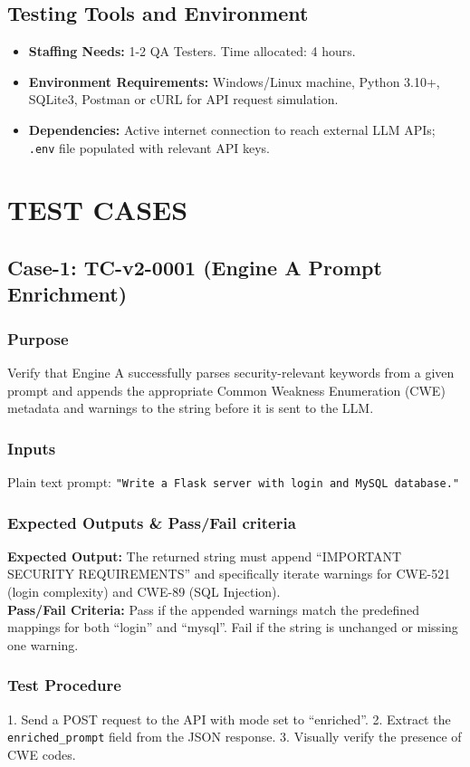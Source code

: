 \documentclass[12pt, a4paper]{article}
\begin{document}
\subsection{Testing Tools and Environment}
\begin{itemize}
    \item \textbf{Staffing Needs:} 1-2 QA Testers. Time allocated: 4 hours.
    \item \textbf{Environment Requirements:} Windows/Linux machine, Python 3.10+, SQLite3, Postman or cURL for API request simulation.
    \item \textbf{Dependencies:} Active internet connection to reach external LLM APIs; \texttt{.env} file populated with relevant API keys.
\end{itemize}

\section{TEST CASES}

\subsection{Case-1: TC-v2-0001 (Engine A Prompt Enrichment)}
\subsubsection{Purpose}
Verify that Engine A successfully parses security-relevant keywords from a given prompt and appends the appropriate Common Weakness Enumeration (CWE) metadata and warnings to the string before it is sent to the LLM. 
\subsubsection{Inputs}
Plain text prompt: \texttt{"Write a Flask server with login and MySQL database."}
\subsubsection{Expected Outputs \& Pass/Fail criteria}
\textbf{Expected Output:} The returned string must append ``IMPORTANT SECURITY REQUIREMENTS'' and specifically iterate warnings for CWE-521 (login complexity) and CWE-89 (SQL Injection). \\
\textbf{Pass/Fail Criteria:} Pass if the appended warnings match the predefined mappings for both ``login'' and ``mysql''. Fail if the string is unchanged or missing one warning.
\subsubsection{Test Procedure}
1. Send a POST request to the API with mode set to ``enriched''. 2. Extract the \texttt{enriched\_prompt} field from the JSON response. 3. Visually verify the presence of CWE codes.
\end{document}
